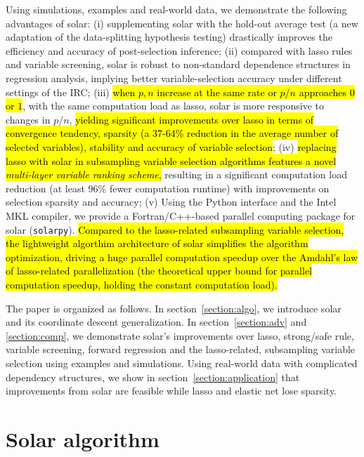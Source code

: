 \documentclass[12pt]{article}
\begin{document}
Using simulations, examples and real-world data, we demonstrate the following advantages of solar: (i) supplementing solar with the hold-out average test (a new adaptation of the data-splitting hypothesis testing) drastically improves the efficiency and accuracy of post-selection inference; (ii) compared with lasso rules and variable screening, solar is robust to non-standard dependence structures in regression analysis, implying better variable-selection accuracy under different settings of the IRC; (iii) \hl{when $p,n$ increase at the same rate or $p/n$ approaches $0$ or $1$}, with the same computation load as lasso, solar is more responsive to changes in $p/n$, \hl{yielding significant improvements over lasso in terms of convergence tendency, sparsity (a 37-64\% reduction in the average number of selected variables), stability and accuracy of variable selection}; (iv) \hl{replacing lasso with solar in subsampling variable selection algorithms features a novel \emph{multi-layer variable ranking scheme},} resulting in a significant computation load reduction (at least 96\% fewer computation runtime) with improvements on selection sparsity and accuracy; (v) Using the Python interface and the Intel MKL compiler, we provide a Fortran/C++-based parallel computing package for solar (\texttt{solarpy}). \hl{Compared to the lasso-related subsampling variable selection, the lightweight algorthim architecture of solar simplifies the algorithm optimization, driving a huge parallel computation speedup over the Amdahl's law of lasso-related parallelization (the theoretical upper bound for parallel computation speedup, holding the constant computation load).}

The paper is organized as follows. In section~\ref{section:algo}, we introduce solar and its coordinate descent generalization. In section~\ref{section:adv} and \ref{section:comp}, we demonstrate solar's improvements over lasso, strong/safe rule, variable screening, forward regression and the lasso-related, subsampling variable selection using examples and simulations. Using real-world data with complicated dependency structures, we show in section~\ref{section:application} that improvements from solar are feasible while lasso and elastic net lose sparsity.


\section{Solar algorithm \label{section:algo}}
\end{document}
